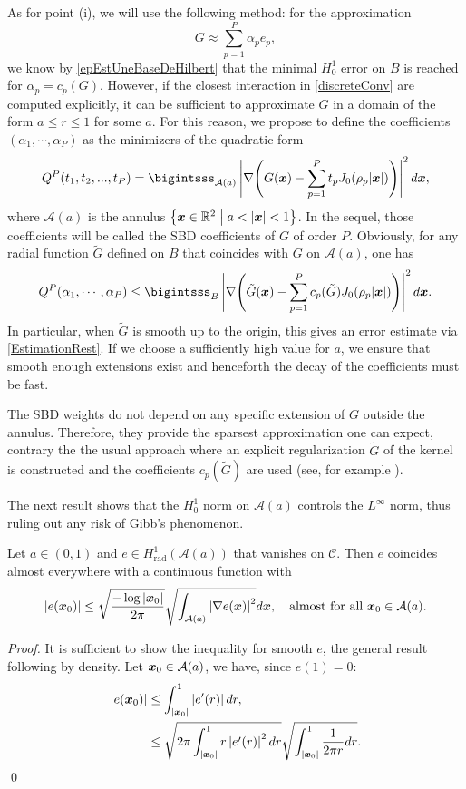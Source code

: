 \documentclass[smallextended]{svjour3}
\begin{document}
As for point (i), we will use the following method: for the approximation 
\[G \approx \sum_{p = 1}^P \alpha_p e_p,\]
we know by \autoref{epEstUneBaseDeHilbert} that the minimal $H^1_0$ error on $B$ is reached for $\alpha_p = c_p(G)$. However, if the closest interaction in \eqref{discreteConv} are computed explicitly, it can be sufficient to approximate $G$ in a domain of the form $a \leq r \leq 1$ for some $a$. For this reason, we propose to define the coefficients $(\alpha_1,\cdots,\alpha_P)$ as the minimizers of the quadratic form
\[ Q^P(t_1,t_2,...,t_P) = \bigintsss_{\mathcal{A}(a)} \left|\nabla \!\left( G(\bs{x}) - \sum_{p=1}^P t_p J_0(\rho_p |\bs{x}|)\right)\right|^2d\bs{x},\]
where $\mathcal{A}(a)$ is the annulus $\left\{\boldsymbol{x} \in \mathbb{R}^2\mathrel{}\middle|\mathrel{}a < \left\lvert \boldsymbol{x} \right\rvert < 1\right\}$. In the sequel, those coefficients will be called the SBD coefficients of $G$ of order $P$. Obviously, for any radial function $\tilde{G}$ defined on $B$ that coincides with $G$ on $\mathcal{A}(a)$, one has 
\[ Q^P(\alpha_1,\cdots,\alpha_P) \leq \bigintsss_{B} \left|\nabla \!\left( \tilde{G}(\bs{x}) - \sum_{p=1}^P c_p(\tilde{G}) J_0(\rho_p |\bs{x}|)\right)\right|^2d\bs{x}. \]
In particular, when $\tilde{G}$ is smooth up to the origin, this gives an error estimate via \autoref{EstimationRest}. If we choose a sufficiently high value for $a$, we ensure that smooth enough extensions exist and henceforth the decay of the coefficients must be fast.				
\begin{remark}
	\label{RemarqueQuiTuePotts}
	The SBD weights do not depend on any specific extension of $G$ outside the annulus. Therefore, they provide the sparsest approximation one can expect, contrary the the usual approach where an explicit regularization $\tilde{G}$ of the kernel is constructed and the coefficients $c_p(\tilde{G})$ are used (see, for example \cite{potts2004fast}). 
\end{remark}									
The next result shows that the $H_0^1$ norm on $\mathcal{A}(a)$ controls the $L^{\infty}$ norm, thus ruling out any risk of Gibb's phenomenon.
\begin{lemma}
	Let $a\in (0,1)$ and $e\in H^1_{\text{rad}}(\mathcal{A}(a))$ that vanishes on $\mathcal{C}$. 
	Then $e$ coincides almost everywhere with a continuous function with
	\[\left\lvert e(\boldsymbol{x}_0) \right\rvert \leq \sqrt{\dfrac{-\log \left\lvert \boldsymbol{x}_0 \right\rvert}{2\pi}}\sqrt{\int_{\mathcal{A}(a)} \left\lvert \nabla e(\boldsymbol{x}) \right\rvert^2} d\boldsymbol{x},\quad  \text{almost for all }\boldsymbol{x}_0 \in \mathcal{A}(a).\]
\end{lemma}
\begin{proof}
	It is sufficient to show the inequality for smooth $e$, the general result following by density. Let $\boldsymbol{x}_0 \in \mathcal{A}(a)$, we have, since $e(1)=0$:
	\begin{align}
		\left\lvert e(\boldsymbol{x}_0) \right\rvert & \leq \int_{\left\lvert \boldsymbol{x}_0 \right\rvert}^1 \left\lvert e'(r) \right\rvert dr,                                                                     \\
		                  & \leq \sqrt{2\pi \int_{\left\lvert \boldsymbol{x}_0 \right\rvert}^1 r \left\lvert e'(r) \right\rvert^2 dr} \sqrt{\int_{\left\lvert \boldsymbol{x}_0 \right\rvert}^1 \frac{1}{2\pi r} dr}.
	\end{align}	
	\qed				
\end{proof}
\end{document}

